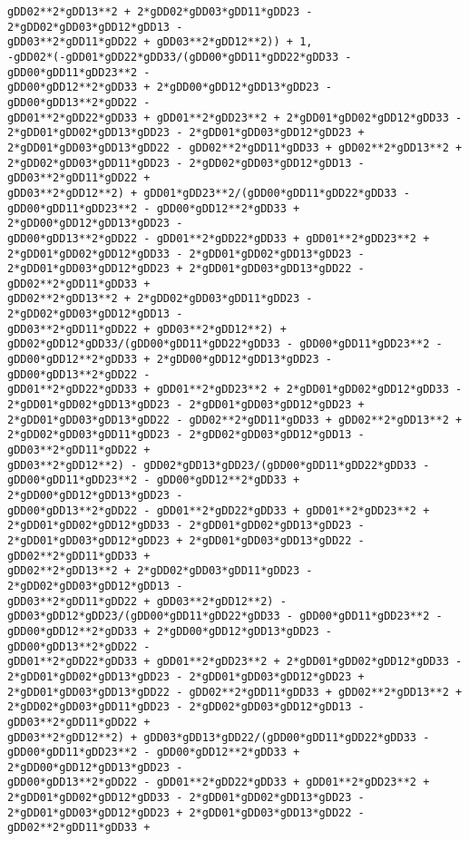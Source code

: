 \documentclass[landscape,letterpaper,10pt,english]{article}
\begin{document}
\begin{Verbatim}[commandchars=\\\{\}]
gDD02**2*gDD13**2 + 2*gDD02*gDD03*gDD11*gDD23 - 2*gDD02*gDD03*gDD12*gDD13 -
gDD03**2*gDD11*gDD22 + gDD03**2*gDD12**2)) + 1,
-gDD02*(-gDD01*gDD22*gDD33/(gDD00*gDD11*gDD22*gDD33 - gDD00*gDD11*gDD23**2 -
gDD00*gDD12**2*gDD33 + 2*gDD00*gDD12*gDD13*gDD23 - gDD00*gDD13**2*gDD22 -
gDD01**2*gDD22*gDD33 + gDD01**2*gDD23**2 + 2*gDD01*gDD02*gDD12*gDD33 -
2*gDD01*gDD02*gDD13*gDD23 - 2*gDD01*gDD03*gDD12*gDD23 +
2*gDD01*gDD03*gDD13*gDD22 - gDD02**2*gDD11*gDD33 + gDD02**2*gDD13**2 +
2*gDD02*gDD03*gDD11*gDD23 - 2*gDD02*gDD03*gDD12*gDD13 - gDD03**2*gDD11*gDD22 +
gDD03**2*gDD12**2) + gDD01*gDD23**2/(gDD00*gDD11*gDD22*gDD33 -
gDD00*gDD11*gDD23**2 - gDD00*gDD12**2*gDD33 + 2*gDD00*gDD12*gDD13*gDD23 -
gDD00*gDD13**2*gDD22 - gDD01**2*gDD22*gDD33 + gDD01**2*gDD23**2 +
2*gDD01*gDD02*gDD12*gDD33 - 2*gDD01*gDD02*gDD13*gDD23 -
2*gDD01*gDD03*gDD12*gDD23 + 2*gDD01*gDD03*gDD13*gDD22 - gDD02**2*gDD11*gDD33 +
gDD02**2*gDD13**2 + 2*gDD02*gDD03*gDD11*gDD23 - 2*gDD02*gDD03*gDD12*gDD13 -
gDD03**2*gDD11*gDD22 + gDD03**2*gDD12**2) +
gDD02*gDD12*gDD33/(gDD00*gDD11*gDD22*gDD33 - gDD00*gDD11*gDD23**2 -
gDD00*gDD12**2*gDD33 + 2*gDD00*gDD12*gDD13*gDD23 - gDD00*gDD13**2*gDD22 -
gDD01**2*gDD22*gDD33 + gDD01**2*gDD23**2 + 2*gDD01*gDD02*gDD12*gDD33 -
2*gDD01*gDD02*gDD13*gDD23 - 2*gDD01*gDD03*gDD12*gDD23 +
2*gDD01*gDD03*gDD13*gDD22 - gDD02**2*gDD11*gDD33 + gDD02**2*gDD13**2 +
2*gDD02*gDD03*gDD11*gDD23 - 2*gDD02*gDD03*gDD12*gDD13 - gDD03**2*gDD11*gDD22 +
gDD03**2*gDD12**2) - gDD02*gDD13*gDD23/(gDD00*gDD11*gDD22*gDD33 -
gDD00*gDD11*gDD23**2 - gDD00*gDD12**2*gDD33 + 2*gDD00*gDD12*gDD13*gDD23 -
gDD00*gDD13**2*gDD22 - gDD01**2*gDD22*gDD33 + gDD01**2*gDD23**2 +
2*gDD01*gDD02*gDD12*gDD33 - 2*gDD01*gDD02*gDD13*gDD23 -
2*gDD01*gDD03*gDD12*gDD23 + 2*gDD01*gDD03*gDD13*gDD22 - gDD02**2*gDD11*gDD33 +
gDD02**2*gDD13**2 + 2*gDD02*gDD03*gDD11*gDD23 - 2*gDD02*gDD03*gDD12*gDD13 -
gDD03**2*gDD11*gDD22 + gDD03**2*gDD12**2) -
gDD03*gDD12*gDD23/(gDD00*gDD11*gDD22*gDD33 - gDD00*gDD11*gDD23**2 -
gDD00*gDD12**2*gDD33 + 2*gDD00*gDD12*gDD13*gDD23 - gDD00*gDD13**2*gDD22 -
gDD01**2*gDD22*gDD33 + gDD01**2*gDD23**2 + 2*gDD01*gDD02*gDD12*gDD33 -
2*gDD01*gDD02*gDD13*gDD23 - 2*gDD01*gDD03*gDD12*gDD23 +
2*gDD01*gDD03*gDD13*gDD22 - gDD02**2*gDD11*gDD33 + gDD02**2*gDD13**2 +
2*gDD02*gDD03*gDD11*gDD23 - 2*gDD02*gDD03*gDD12*gDD13 - gDD03**2*gDD11*gDD22 +
gDD03**2*gDD12**2) + gDD03*gDD13*gDD22/(gDD00*gDD11*gDD22*gDD33 -
gDD00*gDD11*gDD23**2 - gDD00*gDD12**2*gDD33 + 2*gDD00*gDD12*gDD13*gDD23 -
gDD00*gDD13**2*gDD22 - gDD01**2*gDD22*gDD33 + gDD01**2*gDD23**2 +
2*gDD01*gDD02*gDD12*gDD33 - 2*gDD01*gDD02*gDD13*gDD23 -
2*gDD01*gDD03*gDD12*gDD23 + 2*gDD01*gDD03*gDD13*gDD22 - gDD02**2*gDD11*gDD33 +

\end{Verbatim}
\end{document}
